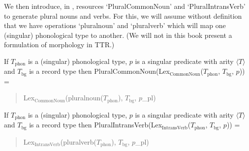 We then introduce, in \nexteg{}, resources `PluralCommonNoun' and
`PluralIntransVerb' to generate plural nouns and verbs.  For this, we
will assume without definition that we have operations `pluralnoun'
and `pluralverb' which will map one (singular) phonological type to
another.  (We will not in this book present a formulation of
morphology in TTR.)
\begin{ex} 
\begin{subex} 
 
\item If $T_{\text{phon}}$ is a (singular) phonological type, $p$ is a
  singular predicate with arity $\langle T\rangle$ and $T_{\text{bg}}$
  is a record type then
  PluralCommonNoun(Lex$_{\text{CommonNoun}}$($T_{\text{phon}}$,
  $T_{\text{bg}}$, $p$)) =
  \begin{quote}
    Lex$_{\text{CommonNoun}}$(pluralnoun($T_{\text{phon}}$),
    $T_{\text{bg}}$, $p$\_pl)
  \end{quote}
  
 
\item If $T_{\text{phon}}$ is a (singular) phonological type, $p$ is a
  singular predicate with arity $\langle T\rangle$ and $T_{\text{bg}}$
  is a record type then
  PluralIntransVerb(Lex$_{\text{IntransVerb}}$($T_{\text{phon}}$,
  $T_{\text{bg}}$, $p$)) =
  \begin{quote}
    Lex$_{\text{IntransVerb}}$(pluralverb($T_{\text{phon}}$),
    $T_{\text{bg}}$, $p$\_pl)
  \end{quote} 
 
\end{subex} 
   
\end{ex} 
  


 
 

